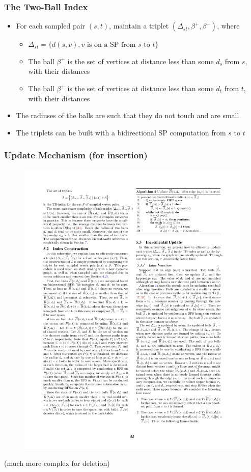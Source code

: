\begin{frame}
  \frametitle{The Two-Ball Index}
  \begin{itemize}
    \item For each sampled pair $(s,t)$, maintain a triplet $(\Delta_{st},
      \beta^+, \beta^-)$, where
      \begin{itemize}
        \item $\Delta_{st}=\{d(s,v), v  \text{ is on a SP from $s$ to
        $t$}\}$
      \item The ball $\beta^+$ is the set of vertices at distance less than some $d_s$
        from $s$, with their distances
      \item The ball $\beta^+$ is the set of vertices at distance less than some $d_t$
        from $t$, with their distances
    \end{itemize}
  \item The radiuses of the balls are such that they do not touch and are small.
  \item The triplets can be built with a bidirectional SP computation
    from $s$ to $t$
  \end{itemize}
\end{frame}

\begin{frame}
  \frametitle{Update Mechanism (for insertion)}
  \begin{figure}
    \includegraphics[width=\textwidth]{imgs/Ayashi-pseudocodeupdate.pdf}
  \end{figure}
  \pause
  (much more complex for deletion)
\end{frame}

